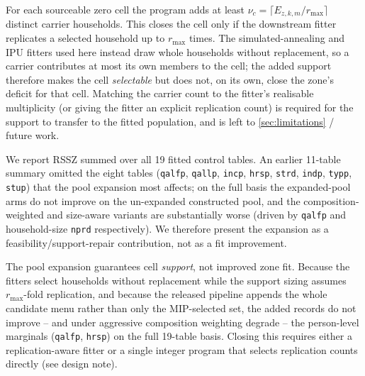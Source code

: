 For each sourceable zero cell the program adds at least
$\nu_c=\lceil E_{z,k,m}/r_{\max}\rceil$ distinct carrier households. This closes
the cell only if the downstream fitter replicates a selected household up to
$r_{\max}$ times. The simulated-annealing and IPU fitters used here instead draw
whole households without replacement, so a carrier contributes at most its own
members to the cell; the added support therefore makes the cell \emph{selectable}
but does not, on its own, close the zone's deficit for that cell. Matching the
carrier count to the fitter's realisable multiplicity (or giving the fitter an
explicit replication count) is required for the support to transfer to the
fitted population, and is left to \cref{sec:limitations} / future work.

We report RSSZ summed over all 19 fitted control tables. An earlier 11-table
summary omitted the eight tables (\texttt{qalfp}, \texttt{qallp}, \texttt{incp},
\texttt{hrsp}, \texttt{strd}, \texttt{indp}, \texttt{typp}, \texttt{stup}) that the
pool expansion most affects; on the full basis the expanded-pool arms do not
improve on the un-expanded constructed pool, and the composition-weighted and
size-aware variants are substantially worse (driven by \texttt{qalfp} and
household-size \texttt{nprd} respectively). We therefore present the expansion as
a feasibility/support-repair contribution, not as a fit improvement.

\item The pool expansion guarantees cell \emph{support}, not improved zone fit.
Because the fitters select households without replacement while the support
sizing assumes $r_{\max}$-fold replication, and because the released pipeline
appends the whole candidate menu rather than only the MIP-selected set, the
added records do not improve -- and under aggressive composition weighting
degrade -- the person-level marginals (\texttt{qalfp}, \texttt{hrsp}) on the full
19-table basis. Closing this requires either a replication-aware fitter or a
single integer program that selects replication counts directly (see design note).
